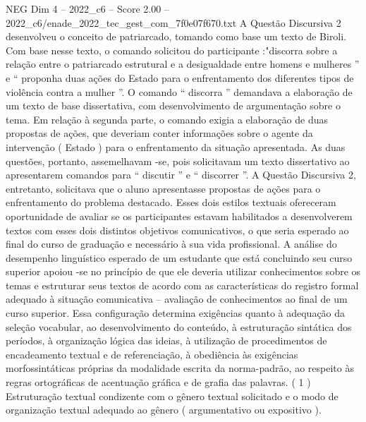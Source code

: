 \begin{textsample}{NEG Dim 4 – 2022\_c6 – Score 2.00 – 2022\_c6/enade\_2022\_tec\_gest\_com\_7f0e07f670.txt}
A Questão Discursiva 2 desenvolveu o conceito de patriarcado, tomando como base um texto de Biroli.
Com base nesse texto, o comando solicitou do participante :"discorra sobre a relação entre o patriarcado estrutural e a desigualdade entre homens e mulheres ” e “ proponha duas ações do Estado para o enfrentamento dos diferentes tipos de violência contra a mulher ”.
O comando “ discorra ” demandava a elaboração de um texto de base dissertativa, com desenvolvimento de argumentação sobre o tema.
Em relação à segunda parte, o comando exigia a elaboração de duas propostas de ações, que deveriam conter informações sobre o agente da intervenção ( Estado ) para o enfrentamento da situação apresentada.
As duas questões, portanto, assemelhavam -se, pois solicitavam um texto dissertativo ao apresentarem comandos para “ discutir ” e “ discorrer ”.
A Questão Discursiva 2, entretanto, solicitava que o aluno apresentasse propostas de ações para o enfrentamento do problema destacado.
Esses dois estilos textuais ofereceram oportunidade de avaliar se os participantes estavam habilitados a desenvolverem textos com esses dois distintos objetivos comunicativos, o que seria esperado ao final do curso de graduação e necessário à sua vida profissional.
A análise do desempenho linguístico esperado de um estudante que está concluindo seu curso superior apoiou -se no princípio de que ele deveria utilizar conhecimentos sobre os temas e estruturar seus textos de acordo com as características do registro formal adequado à situação comunicativa – avaliação de conhecimentos ao final de um curso superior.
Essa configuração determina exigências quanto à adequação da seleção vocabular, ao desenvolvimento do conteúdo, à estruturação sintática dos períodos, à organização lógica das ideias, à utilização de procedimentos de encadeamento textual e de referenciação, à obediência às exigências morfossintáticas próprias da modalidade escrita da norma-padrão, ao respeito às regras ortográficas de acentuação gráfica e de grafia das palavras. ( 1 ) Estruturação textual condizente com o gênero textual solicitado e o modo de organização textual adequado ao gênero ( argumentativo ou expositivo ).

\end{textsample}
